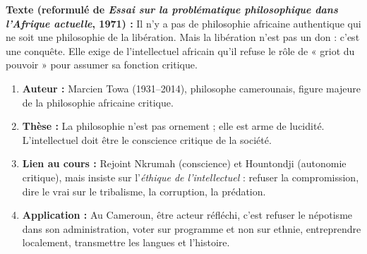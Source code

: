 \documentclass[11pt]{article}
\begin{document}
\begin{experience}
\textbf{Texte (reformulé de \emph{Essai sur la problématique philosophique dans l'Afrique actuelle}, 1971) :} \guillemotleft Il n'y a pas de philosophie africaine authentique qui ne soit une philosophie de la libération. Mais la libération n'est pas un don : c'est une conquête. Elle exige de l'intellectuel africain qu'il refuse le rôle de « griot du pouvoir » pour assumer sa fonction critique. \guillemotright
\begin{enumerate}
\item \textbf{Auteur :} Marcien Towa (1931--2014), philosophe camerounais, figure majeure de la philosophie africaine critique.
\item \textbf{Thèse :} La philosophie n'est pas ornement ; elle est arme de lucidité. L'intellectuel doit être le \guillemotleft conscience critique \guillemotright de la société.
\item \textbf{Lien au cours :} Rejoint Nkrumah (conscience) et Hountondji (autonomie critique), mais insiste sur l'\emph{éthique de l'intellectuel} : refuser la compromission, dire le vrai sur le tribalisme, la corruption, la prédation.
\item \textbf{Application :} Au Cameroun, être acteur réfléchi, c'est refuser le népotisme dans son administration, voter sur programme et non sur ethnie, entreprendre localement, transmettre les langues et l'histoire.
\end{enumerate}
\end{experience}
\end{document}
